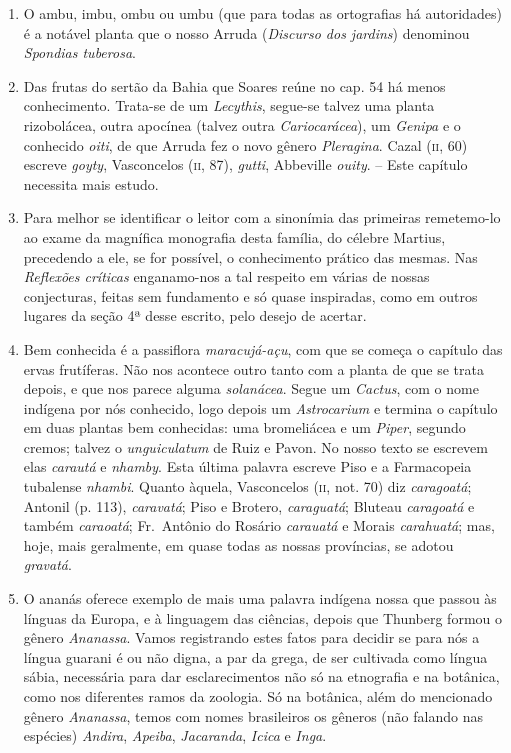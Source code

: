 \begin{enumerate}
\item O ambu, imbu, ombu ou umbu (que para todas as ortografias há autoridades) é a 
notável planta que o nosso Arruda (\textit{Discurso dos jardins}) denominou \textit{Spondias tuberosa}.

\item Das frutas do sertão da Bahia que Soares reúne no cap. 54 há menos 
conhecimento. Trata-se de um \textit{Lecythis}, segue-se talvez uma planta rizobolácea, outra 
apocínea (talvez outra \textit{Cariocarácea}), um \textit{Genipa} e o conhecido \textit{oiti}, de que Arruda fez o 
novo gênero \textit{Pleragina}. Cazal (\textsc{ii}, 60) escreve \textit{goyty}, Vasconcelos (\textsc{ii}, 87), \textit{gutti}, 
Abbeville \textit{ouity}. -- Este capítulo necessita mais estudo.

\item Para melhor se identificar o leitor com a sinonímia das primeiras remetemo-lo ao 
exame da magnífica monografia desta família, do célebre Martius, precedendo a ele, se 
for possível, o conhecimento prático das mesmas.
Nas \textit{Reflexões críticas} enganamo-nos a tal respeito em várias de nossas conjecturas, 
feitas sem fundamento e só quase inspiradas, como em outros lugares da seção 4ª desse 
escrito, pelo desejo de acertar.

\item  Bem conhecida é a passiflora \textit{maracujá-açu}, com que se começa o
capítulo das ervas frutíferas. Não nos acontece outro tanto com a planta
de que se trata depois, e que nos parece alguma \textit{solanácea}. Segue um \textit{Cactus}, 
com o nome indígena por nós conhecido, logo depois um \textit{Astrocarium}
e termina o capítulo em duas plantas bem conhecidas: uma bromeliácea e
um \textit{Piper}, segundo cremos; talvez o \textit{unguiculatum} de Ruiz e Pavon. No nosso
texto se escrevem elas \textit{carautá} e \textit{nhamby}. Esta última palavra escreve Piso
e a Farmacopeia tubalense \textit{nhambi}. Quanto àquela, Vasconcelos (\textsc{ii}, not.
70) diz \textit{caragoatá}; Antonil (p. 113), \textit{caravatá}; Piso e Brotero, \textit{caraguatá};
Bluteau \textit{caragoatá} e também \textit{caraoatá}; Fr.~Antônio do Rosário \textit{carauatá} e
Morais \textit{carahuatá}; mas, hoje, mais geralmente, em quase todas as nossas
províncias, se adotou \textit{gravatá}.

\item O ananás oferece exemplo de mais uma palavra indígena nossa que passou às 
línguas da Europa, e à linguagem das ciências, depois que Thunberg formou o gênero  
\textit{Ananassa}. Vamos registrando estes fatos para decidir se para nós a língua guarani é ou 
não digna, a par da grega, de ser cultivada como língua sábia, necessária para dar 
esclarecimentos não só na etnografia e na botânica, como nos diferentes ramos da 
zoologia. Só na botânica, além do mencionado gênero \textit{Ananassa}, temos com nomes 
brasileiros os gêneros (não falando nas espécies) \textit{Andira}, \textit{Apeiba}, \textit{Jacaranda}, \textit{Icica} e \textit{Inga}.


\end{enumerate}
